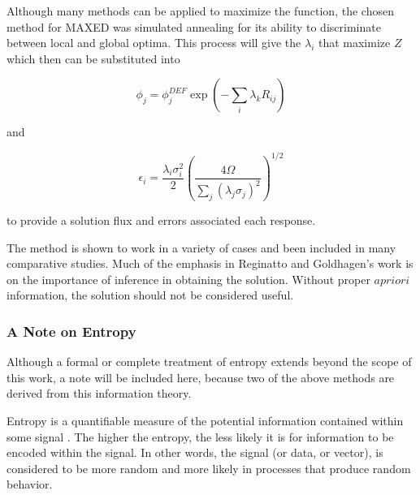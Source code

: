 \noindent
Although many methods can be applied to maximize the function, the chosen method for MAXED was simulated annealing for its ability to discriminate between local and global optima.
This process will give the $\lambda_i$ that maximize $Z$ which then can be substituted into

\begin{equation}
\label{eqn:maxed-flux}
\phi_j = \phi_j^{DEF} \exp(- \sum_i \lambda_k R_{ij})
\end{equation}

\noindent
and

\begin{equation}
\label{eqn:maxed-error}
\epsilon_i = \frac{\lambda_i \sigma_i^2}{2} (\frac{4 \Omega}{\sum_j (\lambda_j \sigma_j)^2})^{1/2}
\end{equation}

\noindent
to provide a solution flux and errors associated each response.

The method is shown to work in a variety of cases and been included in many comparative studies.
Much of the emphasis in Reginatto and Goldhagen's work is on the importance of inference in obtaining the solution.
Without proper $a priori$ information, the solution should not be considered useful.


\subsubsection{A Note on Entropy}
Although a formal or complete treatment of entropy extends beyond the scope of this work, a note will be included here, because two of the above methods are derived from this information theory.

Entropy is a quantifiable measure of the potential information contained within some signal \cite{guiasu1985principle}.
The higher the entropy, the less likely it is for information to be encoded within the signal.
In other words, the signal (or data, or vector), is considered to be more random and more likely in processes that produce random behavior.

